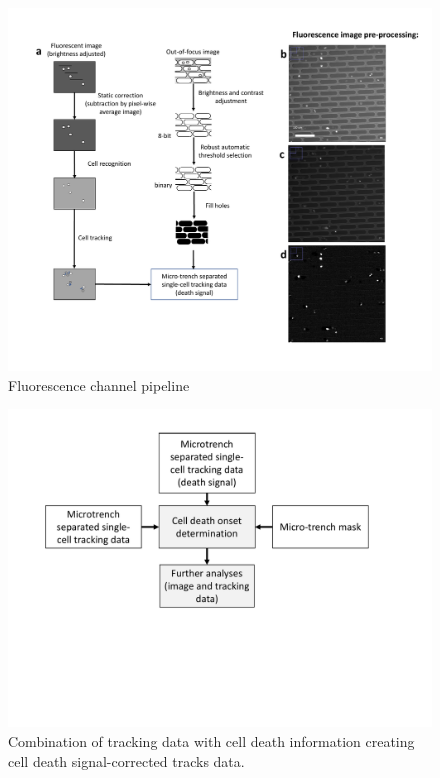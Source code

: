 \documentclass[pdftex,12pt,a4paper]{report}
\begin{document}
\begin{landscape}
\begin{figure}[H]
   \centering
    \includegraphics[height=\textheight]{images/pipeline/02.pdf}
    \caption[Fluoroscence channel pipeline]{Fluorescence channel pipeline}
\end{figure}
\label{fig:pipeline2}
\end{landscape}

\begin{figure}[H]
   \centering
    \includegraphics[height=0.5\textwidth]{images/pipeline/03.pdf}
    \caption[Combination of tracking data with cell death information creating cell death signal-corrected tracks data]{Combination of tracking data with cell death information creating cell death signal-corrected tracks data.}
    \label{fig:pipeline3}
\end{figure}
\end{document}
